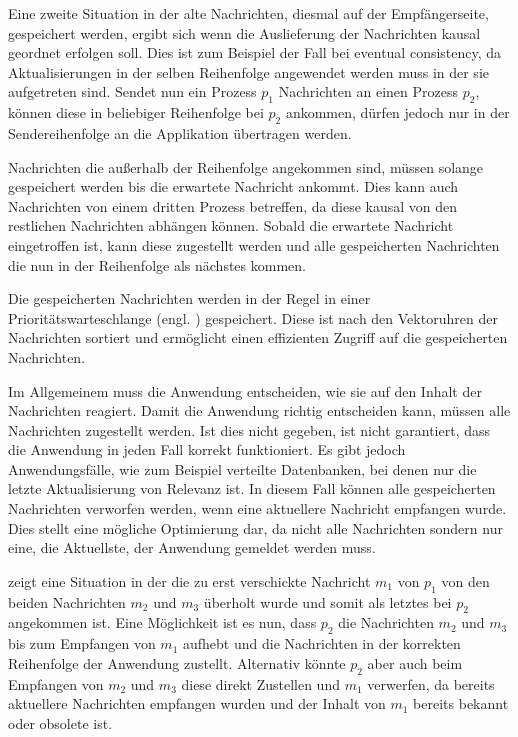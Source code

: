 Eine zweite Situation in der alte Nachrichten, diesmal auf der Empfängerseite, gespeichert werden, ergibt sich wenn die Auslieferung der Nachrichten kausal geordnet erfolgen soll.
Dies ist zum Beispiel der Fall bei eventual consistency, da Aktualisierungen in der selben Reihenfolge angewendet werden muss in der sie aufgetreten sind.
Sendet nun ein Prozess $p_1$ Nachrichten an einen Prozess $p_2$, können diese in beliebiger Reihenfolge bei $p_2$ ankommen, dürfen jedoch nur in der Sendereihenfolge an die Applikation übertragen werden.

Nachrichten die außerhalb der Reihenfolge angekommen sind, müssen solange gespeichert werden bis die erwartete Nachricht ankommt.
Dies kann auch Nachrichten von einem dritten Prozess betreffen, da diese kausal von den restlichen Nachrichten abhängen können.
Sobald die erwartete Nachricht eingetroffen ist, kann diese zugestellt werden und alle gespeicherten Nachrichten die nun in der Reihenfolge als nächstes kommen.

Die gespeicherten Nachrichten werden in der Regel in einer Prioritätswarteschlange (engl. ) gespeichert.
Diese ist nach den Vektoruhren der Nachrichten sortiert und ermöglicht einen effizienten Zugriff auf die gespeicherten Nachrichten.

Im Allgemeinem muss die Anwendung entscheiden, wie sie auf den Inhalt der Nachrichten reagiert.
Damit die Anwendung richtig entscheiden kann, müssen alle Nachrichten zugestellt werden.
Ist dies nicht gegeben, ist nicht garantiert, dass die Anwendung in jeden Fall korrekt funktioniert.
Es gibt jedoch Anwendungsfälle, wie zum Beispiel verteilte Datenbanken, bei denen nur die letzte Aktualisierung von Relevanz ist.
In diesem Fall können alle gespeicherten Nachrichten verworfen werden, wenn eine aktuellere Nachricht empfangen wurde.
Dies stellt eine mögliche Optimierung dar, da nicht alle Nachrichten sondern nur eine, die Aktuellste, der Anwendung gemeldet werden muss.

 zeigt eine Situation in der die zu erst verschickte Nachricht $m_1$ von $p_1$ von den beiden Nachrichten $m_2$ und $m_3$ überholt wurde und somit als letztes bei $p_2$ angekommen ist.
Eine Möglichkeit ist es nun, dass $p_2$ die Nachrichten $m_2$ und $m_3$ bis zum Empfangen von $m_1$ aufhebt und die Nachrichten in der korrekten Reihenfolge der Anwendung zustellt.
Alternativ könnte $p_2$ aber auch beim Empfangen von $m_2$ und $m_3$ diese direkt Zustellen und $m_1$ verwerfen, da bereits aktuellere Nachrichten empfangen wurden und der Inhalt von $m_1$ bereits bekannt oder obsolete ist.

